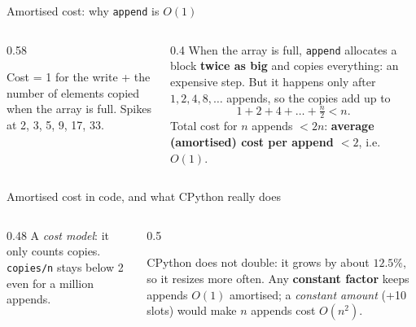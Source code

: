 \documentclass[aspectratio=169,10pt]{beamer}
\newcommand{\pyouts}[2]{}
\begin{document}
\begin{frame}{Amortised cost: why \texttt{append} is $O(1)$}
\begin{columns}[T]
\begin{column}{0.58\textwidth}
\begin{sfig}[0.62]
\end{sfig}
{\scriptsize Cost = 1 for the write + the number of elements copied when the array is full. Spikes at 2, 3, 5, 9, 17, 33.}
\end{column}
\begin{column}{0.4\textwidth}
{\small
When the array is full, \texttt{append} allocates a block \textbf{twice as big} and copies everything: an expensive step. But it happens only after $1,2,4,8,\dots$ appends, so the copies add up to
\[1+2+4+\dots+\tfrac n2<n.\]
Total cost for $n$ appends $<2n$: \textbf{average (amortised) cost per append $<2$}, i.e.\ $O(1)$.}
\vspace{1mm}
\pyouts{\fontsize{7}{8.4}}{amortised_demo}
\end{column}
\end{columns}
\end{frame}

\begin{frame}{Amortised cost in code, and what CPython really does}
\begin{columns}[T]
\begin{column}{0.48\textwidth}
\vspace{2mm}
{\small
A \emph{cost model}: it only counts copies. \texttt{copies/n} stays below 2 even for a million appends.}
\end{column}
\begin{column}{0.5\textwidth}
\pyouts{\fontsize{7.6}{9}}{getsizeof_demo}
\vspace{1mm}
{\small
CPython does not double: it grows by about $12.5\%$, so it resizes more often. Any \textbf{constant factor} keeps appends $O(1)$ amortised; a \emph{constant amount} (+10 slots) would make $n$ appends cost $O(n^2)$.}
\end{column}
\end{columns}
\end{frame}
\end{document}
